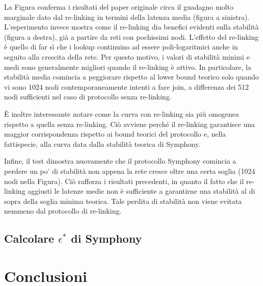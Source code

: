 \documentclass[prodmode,acmtap]{acmlarge}
\begin{document}
La Figura conferma i risultati del paper originale circa il guadagno molto marginale dato dal re-linking in termini della latenza media (figura a sinistra). L'esperimento invece  mostra come il re-linking dia benefici evidenti sulla stabilità (figura a destra), già a partire da reti con pochissimi nodi. L'effetto del re-linking è quello di far sì che i lookup continuino ad essere poli-logaritmici anche in seguito alla crescita della rete. Per questo motivo, i valori di stabilità minimi e medi sono generalmente migliori quando il re-linking è attivo. In particolare, la stabilità media comincia a peggiorare rispetto al lower bound teorico solo quando vi sono 1024 nodi contemporaneamente intenti a fare join, a differenza dei 512 nodi sufficienti nel caso di protocollo senza re-linking.

È inoltre interessante notare come la curva con re-linking sia più omogenea rispetto a quella senza re-linking. Ciò avviene perché il re-linking garantisce una maggior corrispondenza rispetto ai bound teorici del protocollo e, nella fattispecie, alla curva data dalla stabilità teorica di Symphony.

Infine, il test dimostra nuovamente che il protocollo Symphony comincia a perdere un po' di stabilità non appena la rete cresce oltre una certa soglia (1024 nodi nella Figura). Ciò rafforza i risultati precedenti, in quanto il fatto che il re-linking aggiusti le latenze medie non è sufficiente a garantirne una stabilità al di sopra della soglia minima teorica. Tale perdita di stabilità non viene evitata nemmeno dal protocollo di re-linking.



\subsection{Calcolare $\epsilon^*$ di Symphony}
\vspace*{100mm}



\section{Conclusioni} \label{conclusioni}
\vspace*{100mm}
























\end{document}
